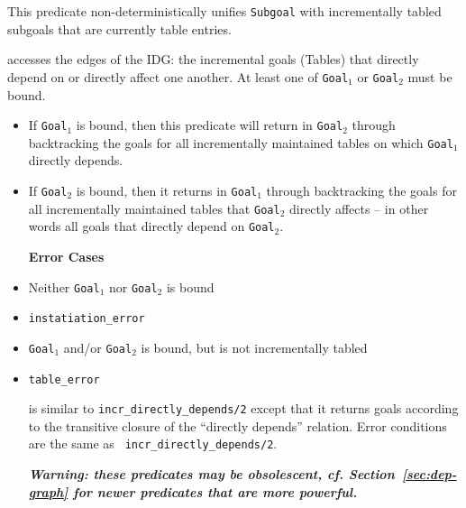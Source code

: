 \begin{description}

%
This predicate non-deterministically unifies {\tt Subgoal} with
incrementally tabled subgoals that are currently table entries.

accesses the edges of the IDG: the incremental goals (Tables) that
directly depend on or directly affect one another.  At least one of
{\tt Goal$_1$} or {\tt Goal$_2$} must be bound.
\begin{itemize}
\item If {\tt Goal$_1$} is bound, then this predicate will return in
  {\tt Goal$_2$} through backtracking the goals for all incrementally
  maintained tables on which {\tt Goal$_1$} directly depends.
\item If {\tt Goal$_2$} is bound, then it returns in {\tt Goal$_1$}
  through backtracking the goals for all incrementally maintained
  tables that {\tt Goal$_2$} directly affects -- in other words all
  goals that directly depend on {\tt Goal$_2$}.  \ei

{\bf Error Cases}
\bi
\item Neither {\tt Goal$_1$} nor {\tt Goal$_2$} is bound 
\bi
\item 	{\tt instatiation\_error}
\ei
\item {\tt Goal$_1$} and/or {\tt Goal$_2$} is bound, but is not
  incrementally tabled
\bi
\item 	{\tt table\_error}
\ei
\ei

is similar to {\tt incr\_directly\_depends/2} except that it returns
goals according to the transitive closure of the ``directly depends''
relation.  Error conditions are the same as {\tt
  incr\_directly\_depends/2}.

%

{\bf {\em Warning: these predicates may be obsolescent, cf.
    Section~\ref{sec:dep-graph} for newer predicates that are more
    powerful.}}


\end{itemize}
\end{description}
